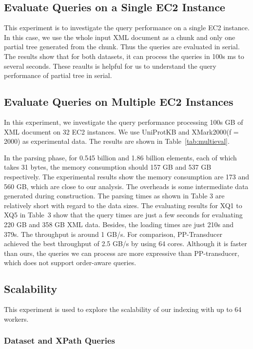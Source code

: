 \subsection{Evaluate Queries on a Single EC2 Instance}

This experiment is to investigate the query performance on a single EC2
instance. In this case, we use the whole input XML document as a chunk and only
one partial tree generated from the chunk. Thus the queries are evaluated in
serial. The results show that for both datasets, it can process the queries
in 100s ms to several seconds. These reaults is helpful for us to understand
the query performance of partial tree in serial.


\subsection{Evaluate Queries on Multiple EC2 Instances}

In this experiment, we investigate the query performance processing 100s GB of
XML document on 32 EC2 instances. We use UniProtKB and XMark2000(f = 2000) as
experimental data. The results are shown in Table~\ref{tab:multieval}. 

In the parsing phase, for 0.545 billion and 1.86 billion elements, each of which
takes 31 bytes, the memory consumption should 157 GB and 537 GB respectively.
The experimental results show the memory consumption are 173 and 560 GB, which
are close to our analysis.  The overheads is some intermediate data generated
during construction. The parsing times as shown in Table 3 are relatively short
with regard to the data sizes. The evaluating results for XQ1 to XQ5 in Table~3
show that  the query times are just a few seconds for evaluating 220 GB and 358
GB XML data.  Besides, the loading times are just 210s and 379s.  The throughput
is around 1 GB/s. For comparison, PP-Transducer~\cite{OgTP13} achieved the best
throughput of 2.5 GB/s by using 64 cores. Although it is faster than ours, the
queries we can process are more expressive than PP-transducer, which does not
support order-aware queries.



\subsection{Scalability}
This experiment is used to explore the scalability of our indexing with up to 
64 workers.

\subsubsection{Dataset and XPath Queries} 

